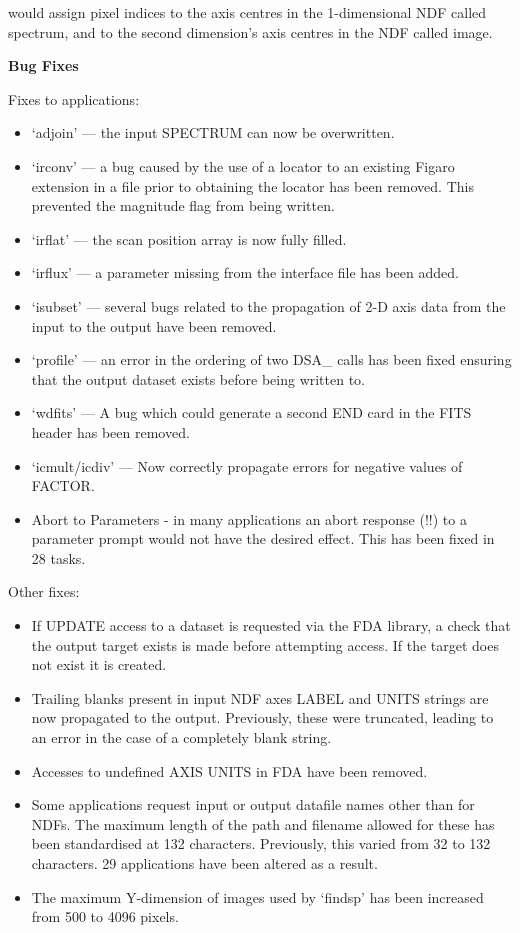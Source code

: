\documentclass[11pt,twoside]{article}
\begin{document}
   would assign pixel indices to the axis centres in the 1-dimensional
   NDF called spectrum, and to the second dimension's axis centres in
   the NDF called image.


{\bf    Bug Fixes}

   Fixes to applications:

\begin{itemize}
\item `adjoin'  --- the input SPECTRUM can now be overwritten.
\item `irconv'  --- a bug caused by the use of a locator to an existing
	        Figaro extension in a file prior to obtaining the
	        locator has been removed.  This prevented the
	        magnitude flag from being written.
\item `irflat'  --- the scan position array is now fully filled.
\item `irflux'  --- a parameter missing from the interface file has
                been added.
\item `isubset' --- several bugs related to the propagation of 2-D
		axis data from the input to the output have been
		removed.
\item `profile' --- an error in the ordering of two DSA\_ calls has
		been fixed ensuring that the output dataset exists
		before being written to.
\item `wdfits'  --- A bug which could generate a second END card in the
                FITS header has been removed.
\item `icmult/icdiv' --- Now correctly propagate errors for negative values
                of FACTOR.
\item Abort to Parameters - in many applications an abort response
		(!!) to a parameter prompt would not have the
		desired effect.  This has been fixed in 28 tasks.
\end{itemize}

   Other fixes:

\begin{itemize}
\item If UPDATE access to a dataset is requested via the FDA
      library, a check that the output target exists is made
      before attempting access.  If the target does not exist it
      is created.
\item Trailing blanks present in input NDF axes LABEL and UNITS
      strings are now propagated to the output.  Previously, these
      were truncated, leading to an error in the case of a
      completely blank string.
\item Accesses to undefined AXIS UNITS in FDA have been removed.
\item Some applications request input or output datafile names
      other than for NDFs.  The maximum length of the path and
      filename allowed for these has been standardised at 132
      characters.  Previously, this varied from 32 to 132
      characters.  29 applications have been altered as a result.
\item The maximum Y-dimension of images used by `findsp' has been increased
      from 500 to 4096 pixels.
\end{itemize}
\end{document}
